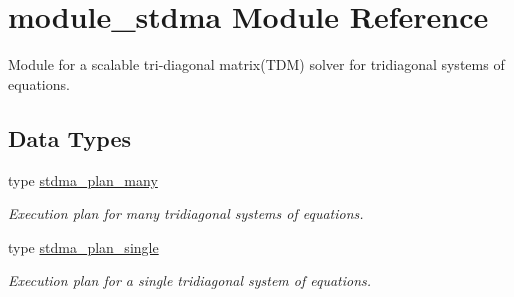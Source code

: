 \hypertarget{namespacemodule__stdma}{}\section{module\+\_\+stdma Module Reference}
\label{namespacemodule__stdma}


Module for a scalable tri-\/diagonal matrix(\+T\+D\+M) solver for tridiagonal systems of equations.  


\subsection*{Data Types}
\begin{DoxyCompactItemize}
\item 
type \mbox{\hyperlink{structmodule__stdma_1_1stdma__plan__many}{stdma\+\_\+plan\+\_\+many}}
\begin{DoxyCompactList}\small\item\em Execution plan for many tridiagonal systems of equations. \end{DoxyCompactList}\item 
type \mbox{\hyperlink{structmodule__stdma_1_1stdma__plan__single}{stdma\+\_\+plan\+\_\+single}}
\begin{DoxyCompactList}\small\item\em Execution plan for a single tridiagonal system of equations. \end{DoxyCompactList}\end{DoxyCompactItemize}
